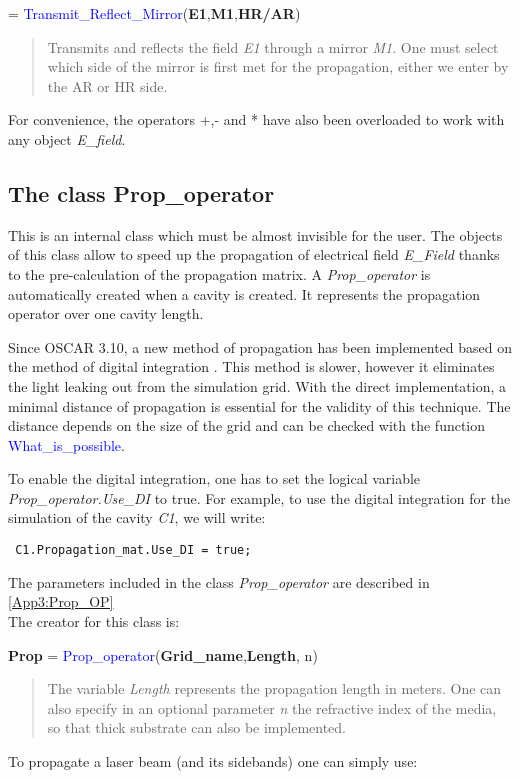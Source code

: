 = \textcolor{blue}{Transmit\_Reflect\_Mirror}(\textbf{E1},\textbf{M1},\textbf{HR/AR})
\vspace*{-0.2cm}
\begin{quote}
Transmits and reflects the field \textsl{E1} through a mirror \textsl{M1}. One must select which side of the mirror is first met for the propagation, either we enter by the AR or HR side.
\end{quote}

For convenience, the operators +,- and * have also been overloaded to work with any object \textsl{E\_field}.


\subsection{The class Prop\_operator}
\label{Sec:DI}
This is an internal class which must be almost invisible for the user. The objects of this class allow to speed up the propagation of electrical field \textsl{E\_Field} thanks to the pre-calculation of the propagation matrix. A \textsl{Prop\_operator} is automatically created when a cavity is created. It represents the propagation operator over one cavity length.

Since OSCAR 3.10, a new method of propagation has been implemented based on the method of digital integration \cite{DI_paper}. This method is slower, however it eliminates the light leaking out from the simulation grid. With the direct implementation, a minimal distance of propagation is essential for the validity of this technique. The distance depends on the size of the grid and can be checked with the function \textcolor{blue}{What\_is\_possible}.

To enable the digital integration, one has to set the logical variable \textsl{Prop\_operator.Use\_DI} to true. For example, to use the digital integration for the simulation of the cavity \textsl{C1}, we will write:

\verb? C1.Propagation_mat.Use_DI = true; ?

The parameters included in the class \textsl{Prop\_operator} are described in \ref{App3:Prop_OP}\\


The creator for this class is:

\noindent \textbf{Prop} = \textcolor{blue}{Prop\_operator}(\textbf{Grid\_name},\textbf{Length}, n)

\vspace*{-0.2cm}
\begin{quote}
The variable \textsl{Length} represents the propagation length in meters. One can also specify in an optional parameter \textsl{n} the refractive index of the media, so that thick substrate can also be implemented.
\end{quote}
To propagate a laser beam (and its sidebands) one can simply use:

